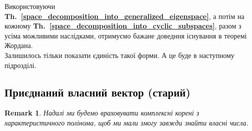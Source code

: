 \documentclass[a4paper, 10pt]{article}
\theoremstyle{theoremdd}
\newtheorem{remark}[theorem]{Remark}
\newcommand\thref[1]{\textbf{Th.~\ref{#1}}}
\begin{document}
\noindent
Використовуючи \thref{space_decomposition_into_generalized_eigenspace}, а потім на кожному \thref{space_decomposition_into_cyclic_subspaces}, разом з усіма можливими наслідками, отримуємо бажане доведння існування в теоремі Жордана.\\
Залишилось тільки показати єдиність такої форми. А це буде в наступному підрозділі.

\iffalse
\subsection{Приєднаний власний вектор (старий)}
\begin{remark}
Надалі ми будемо враховувати комплексні корені з характеристичного полінома, щоб ми мали змогу завжди знайти власні числа.
\end{remark}
\end{document}
